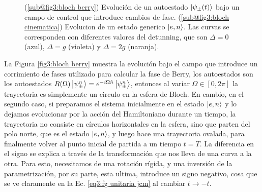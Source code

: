 \begin{figure}[H]
\begin{subfigure}[h]{0.49\textwidth}
        \caption{}
        \label{fig3:bloch cinematica}
    \end{subfigure}
    \caption{(\ref{sub@fig3:bloch berry}) Evolución de un autoestado $\ket{\psi_\pm(t)}$ bajo un campo de control que introduce cambios de fase. (\ref{sub@fig3:bloch cinematica}) Evolucion de un estado generico $\ket{e,n}$. Las curvas se corresponden con diferentes valores del detunning, que son $\Delta=0$ (azul), $\Delta=g$ (violeta) y $\Delta=2g$ (naranja).}
    \label{fig3:esfera de bloch jcm}
\end{figure}
La Figura \ref{fig3:bloch berry} muestra la evolución bajo el campo que introduce un corrimiento de fases utilizado para calcular la fase de Berry, los autoestados son los autoestados $R(\Omega)\ket{\psi_\pm^n}=e^{-i\Omega \hat n}\ket{\psi_\pm^n}$, entonces al variar $\Omega\in [0,2\pi]$ la trayectoria es simplemente un circulo en la esfera de Bloch. En cambio, en el segundo caso, si preparamos el sistema inicialmente en el estado $\ket{e,n}$ y lo dejamos evolucionar por la acción del Hamiltoniano durante un tiempo, la trayectoria no consiste en círculos horizontales en la esfera, sino que parten del polo norte, que es el estado $\ket{e,n}$, y luego hace una trayectoria ovalada, para finalmente volver al punto inicial de partida a un tiempo $t=T$. La diferencia en el signo se explica a través de la transformación que nos lleva de una curva a la otra. Para esto, necesitamos de una rotación rígida, y una inversión de la parametrización, por su parte, esta ultima, introduce un signo negativo, cosa que se ve claramente en la Ec. \ref{eq3:fg unitaria jcm} al cambiar $t\rightarrow -t$.

